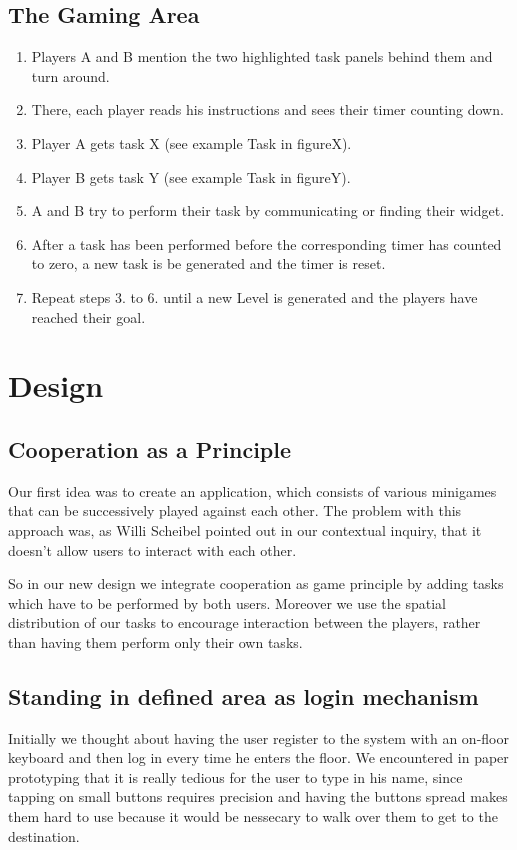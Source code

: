 \documentclass{sigchi}
\begin{document}
\subsection{The Gaming Area}
\vspace{2mm}
\begin{enumerate}
\item Players A and B mention the two highlighted task panels behind them and turn around.
\item There, each player reads his instructions and sees their timer counting down.
\item Player A gets task X (see example Task in figureX).
\item Player B gets task Y (see example Task in figureY).
\item A and B try to perform their task by communicating or finding their widget.
\item After a task has been performed before the corresponding timer has counted to zero, a new task is be generated and the timer is reset.
\item Repeat steps 3. to 6. until a new Level is generated and the players have reached their goal.
\end{enumerate}




\section{Design}


\subsection{Cooperation as a Principle}
\vspace{1mm}
Our first idea was to create an application, which consists of various minigames that can be successively played against each other. The problem with this approach was, as Willi Scheibel pointed out in our contextual inquiry, that it doesn't allow users to interact with each other. 

So in our new design we integrate cooperation as game principle by adding tasks which have to be performed by both users. Moreover we use the spatial distribution of our tasks to encourage interaction between the players, rather than having them perform only their own tasks. 
 
\subsection{Standing in defined area as login mechanism}
\vspace{1mm}
Initially we thought about having the user register to the system with an on-floor keyboard and then log in every time he enters the floor. We encountered in paper prototyping that it is really tedious for the user to type in his name, since tapping on small buttons requires precision and having the buttons spread makes them hard to use because it would be nessecary to walk over them to get to the destination. 
\end{document}
